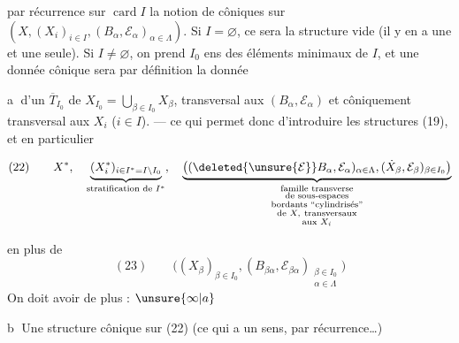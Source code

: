 par récurrence sur $\operatorname{card}I$ la notion de
  côniques sur 
$(X,(X_i)_{i\in I},(B_\alpha,\mathcal E_\alpha)_{\alpha\in\Lambda})$.
 Si $I=\varnothing$, ce sera la structure
vide (il y en a une et une seule). Si
$I\ne\varnothing$, on prend $I_0$ ens des éléments minimaux
de $I$, et une donnée cônique sera par
définition la donnée

\textcircled{a} d'un  $\overline T_{I_0}$
de  $X_{I_0}=\bigcup_{\beta\in I_0}X_\beta$,
transversal aux $(B_\alpha,\mathcal E_\alpha)$ et
côniquement transversal aux $X_i$ ($i\in I$).
--- ce qui permet donc d'introduire les
structures (19), et en particulier

\[
(22)\qquad
X^*,\quad
\underbrace{(X_i^*)_{i\in I^*=I\setminus I_0}}
_{\text{stratification de }I^*},
\quad
\underbrace{\big((\deleted{\unsure{\mathcal E}}B_\alpha,\mathcal E_\alpha)_{\alpha\in\Lambda},
(\dot X_\beta,\mathcal E_\beta)_{\beta\in I_0}\big)}
_{\substack{\text{famille transverse}\\\text{de sous-espaces}\\
\text{bordants ``cylindrisés''}\\
\text{de }X,\ \text{transversaux}\\\text{aux }X_i}}
\]

en plus de
\[
(23)\qquad
\big((X_\beta)_{\beta\in I_0},
(B_{\beta\alpha},\mathcal E_{\beta\alpha})_{\substack{\beta\in I_0\\\alpha\in\Lambda}}\big)
\]
On doit avoir de plus : $\unsure{\infty|a}$

\textcircled{b} Une structure cônique sur (22) (ce qui
a un sens, par récurrence\ldots)
